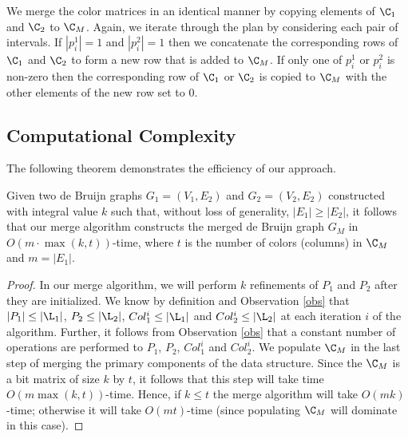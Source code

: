 We merge the color matrices in an identical manner by copying elements of $\C_1$ and $\C_2$ to $\C_M$.  Again, we iterate through the plan by considering each pair of intervals. If $|p_i^1| = 1$ and $|p_i^2| = 1$ then we concatenate the corresponding rows of $\C_1$ and $\C_2$ to form a new row that is added to $\C_M$.  If only one of $p_i^1$ or $p_i^2 $ is non-zero then the corresponding row of $\C_1$ or $\C_2$ is copied to $\C_M$ with the other elements of the new row set to $0$.


\subsection*{Computational Complexity}

The following theorem demonstrates the efficiency of our approach. 

\begin{theorem} Given two de Bruijn graphs $G_1 = (V_1, E_2)$ and $G_2 = (V_2, E_2)$ constructed with integral value $k$ such that, without loss of generality, $|E_1| \geq |E_2|$, it follows that our merge algorithm constructs the merged de Bruijn graph $G_M$ in $O(m \cdot \max(k, t))$-time, where $t$ is the number of colors (columns) in $\C_M$ and $m = |E_1|$. \end{theorem}

\begin{proof}   %
  In our merge algorithm, we will perform $k$ refinements of $P_1$ and $P_2$ after they are initialized. We know by definition and Observation \ref{obs} that $|P_1| \leq |\L_1|$,  $P_2 \leq |\L_2|$, $Col_1^i \leq |\L_1|$ and $Col_2^i \leq |\L_2|$ at each iteration $i$ of the algorithm.  Further, it follows from Observation \ref{obs} that a constant number of operations are performed to $P_1$,  $P_2$, $Col_1^i$ and $Col_2^i$. We populate $\C_M$ in the last step of merging the primary components of the data structure.  Since the  $\C_M$ is a bit matrix of size $k$ by $t$, it follows that this step will take time $O(m \max(k, t))$-time.  Hence, if $k \leq t$ the merge algorithm will take $O(mk)$-time; otherwise it will take $O(mt)$-time (since populating $\C_M$ will dominate in this case). 
\end{proof} 




